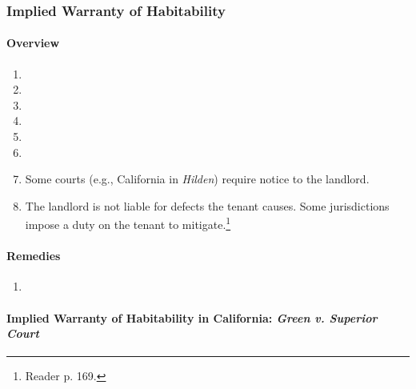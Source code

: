 \subsubsection{Implied Warranty of Habitability} %

\paragraph{Overview}

\begin{enumerate}
    \item %
    \item %
    \item %
    \item %
    \item %
    \item %
    \item Some courts (e.g., California in \emph{Hilden}) require notice to 
    the landlord.
    \item The landlord is not liable for defects the tenant causes. Some 
    jurisdictions impose a duty on the tenant to mitigate.\footnote{Reader p. 
    169.}
\end{enumerate}

\paragraph{Remedies}

\begin{enumerate}
    \item %
\end{enumerate}

\paragraph{Implied Warranty of Habitability in California: \emph{Green v. 
Superior Court}}

